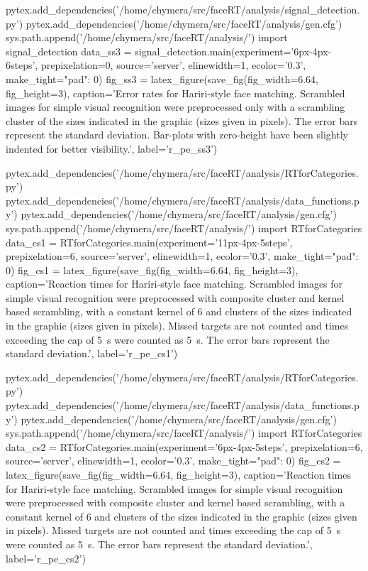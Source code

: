 \begin{pycode}
pytex.add_dependencies('/home/chymera/src/faceRT/analysis/signal_detection.py')
pytex.add_dependencies('/home/chymera/src/faceRT/analysis/gen.cfg')
sys.path.append('/home/chymera/src/faceRT/analysis/')
import signal_detection
data_ss3 = signal_detection.main(experiment='6px-4px-6steps', prepixelation=0, source='server', elinewidth=1, ecolor='0.3', make_tight={"pad": 0})
fig_ss3 = latex_figure(save_fig(fig_width=6.64, fig_height=3), caption='Error rates for Hariri-style face matching. Scrambled images for simple visual recognition were preprocessed only with a scrambling cluster of the sizes indicated in the graphic (sizes given in pixels). The error bars represent the standard deviation. Bar-plots with zero-height have been slightly indented for better visibility.', label='r_pe_ss3')
\end{pycode}
\begin{pycode}
pytex.add_dependencies('/home/chymera/src/faceRT/analysis/RTforCategories.py')
pytex.add_dependencies('/home/chymera/src/faceRT/analysis/data_functions.py')
pytex.add_dependencies('/home/chymera/src/faceRT/analysis/gen.cfg')
sys.path.append('/home/chymera/src/faceRT/analysis/')
import RTforCategories
data_cs1 = RTforCategories.main(experiment='11px-4px-5steps', prepixelation=6, source='server', elinewidth=1, ecolor='0.3', make_tight={"pad": 0})
fig_cs1 = latex_figure(save_fig(fig_width=6.64, fig_height=3), caption='Reaction times for Hariri-style face matching. Scrambled images for simple visual recognition were preprocessed with composite cluster and kernel based scrambling, with a constant kernel of \SI{6}{\pixel} and clusters of the sizes indicated in the graphic (sizes given in pixels). Missed targets are not counted and times exceeding the cap of \SI{5}{\second} were counted as \SI{5}{\second}. The error bars represent the standard deviation.', label='r_pe_cs1')
\end{pycode}
\begin{pycode}
pytex.add_dependencies('/home/chymera/src/faceRT/analysis/RTforCategories.py')
pytex.add_dependencies('/home/chymera/src/faceRT/analysis/data_functions.py')
pytex.add_dependencies('/home/chymera/src/faceRT/analysis/gen.cfg')
sys.path.append('/home/chymera/src/faceRT/analysis/')
import RTforCategories
data_cs2 = RTforCategories.main(experiment='6px-4px-5steps', prepixelation=6, source='server', elinewidth=1, ecolor='0.3', make_tight={"pad": 0})
fig_cs2 = latex_figure(save_fig(fig_width=6.64, fig_height=3), caption='Reaction times for Hariri-style face matching. Scrambled images for simple visual recognition were preprocessed with composite cluster and kernel based scrambling, with a constant kernel of \SI{6}{\pixel} and clusters of the sizes indicated in the graphic (sizes given in pixels). Missed targets are not counted and times exceeding the cap of \SI{5}{\second} were counted as \SI{5}{\second}. The error bars represent the standard deviation.', label='r_pe_cs2')
\end{pycode}
